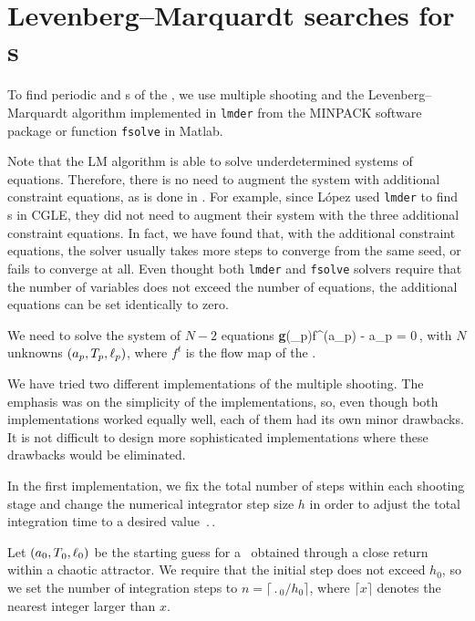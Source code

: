 
\section{Levenberg--Marquardt searches for \rpo s}
\label{sec:lmderRLD}
%
To find periodic and \rpo s of the \KSe , we use multiple shooting and
the Levenberg--Marquardt algorithm implemented in {\tt lmder} from
the MINPACK software package or function {\tt fsolve} in Matlab.

Note that the LM algorithm is able to solve underdetermined systems of
equations.  Therefore, there is no need to augment the system with
additional constraint equations, as is done in .
For example, since L{\'o}pez {\etal} used {\tt lmder} to
find \rpo s in CGLE, they did not need to augment their system with the
three additional constraint equations.  In fact, we have found that,
with the additional constraint equations, the solver usually takes more
steps to converge from the same seed, or fails to converge at all. Even
thought both {\tt lmder} and {\tt fsolve} solvers require that the
number of variables does not exceed the number of equations, the
additional equations can be set identically to zero.

We need to solve the system of $N-2$ equations
\beq
  {\bf g}(\shift_p)f^(a_p) - a_p = 0\,,
with $N$ unknowns $(a_p, {T_{p}}, \ell_p)$, where $f^t$
is the flow map of the \KSe.

We have tried two different implementations of the multiple shooting.
The emphasis was on the simplicity of the implementations, so, even
though both implementations worked equally well, each of them had
its own minor drawbacks.  It is not difficult to design more
sophisticated implementations where these drawbacks would be
eliminated.

In the first implementation, we fix the total number of steps within
each shooting stage and change the numerical integrator step size
$h$ in order to adjust the total integration time to a desired value
$\period{}$.

Let $(a_0, {T_{}}_0, \ell_0)$ be the starting guess for a \rpo\
obtained through a close return within a chaotic attractor.  We
require that the initial step does not exceed $h_0$, so we set the
number of integration steps to $n = \lceil \period{}_0/h_0\rceil$, where
$\lceil x \rceil$ denotes the nearest integer larger than $x$.

